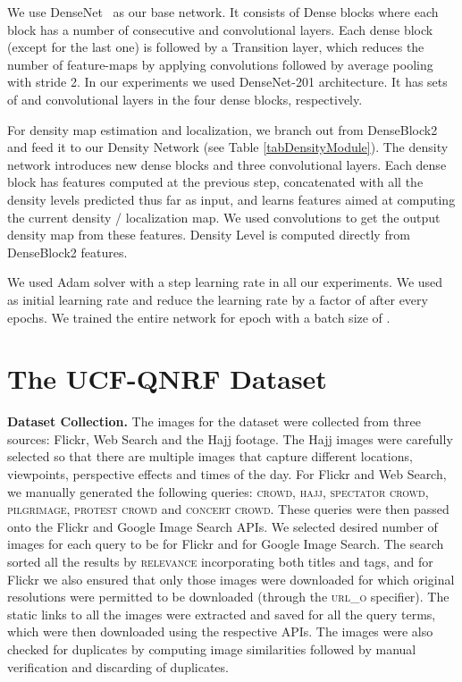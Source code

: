 \documentclass[runningheads]{llncs}
\begin{document}
We use DenseNet~\cite{huang2016densely} as our base network. It consists of  Dense blocks where each block has a number of consecutive  and  convolutional layers. Each dense block (except for the last one) is followed by a Transition layer, which reduces the number of feature-maps by applying  convolutions followed by  average pooling with stride 2. In our experiments we used DenseNet-201 architecture. It has  sets of  and  convolutional layers in the four dense blocks, respectively.

For density map estimation and localization, we branch out from DenseBlock2 and feed it to our Density Network (see Table \ref{tabDensityModule}). The density network introduces  new dense blocks and three   convolutional layers. Each dense block has features computed at the previous step, concatenated with all the density levels predicted thus far as input, and learns features aimed at computing the current density / localization map. We used  convolutions to get the output density map from these features. Density Level  is computed directly from DenseBlock2 features.

We used Adam solver with a step learning rate in all our experiments. We used  as initial learning rate and reduce the learning rate by a factor of  after every  epochs. We trained the entire network for  epoch with a batch size of .

\section{The UCF-QNRF Dataset}\label{secDataset}
\smallskip
\noindent\textbf{Dataset Collection.} The images for the dataset were collected from three sources: Flickr, Web Search and the Hajj footage. The Hajj images were carefully selected so that there are multiple images that capture different locations, viewpoints, perspective effects and times of the day. For Flickr and Web Search, we manually generated the following queries: \textsc{crowd}, \textsc{hajj}, \textsc{spectator crowd}, \textsc{pilgrimage}, \textsc{protest crowd} and \textsc{concert crowd}. These queries were then passed onto the Flickr and Google Image Search APIs. We selected desired number of images for each query to be  for Flickr and  for Google Image Search. The search sorted all the results by \textsc{relevance} incorporating both titles and tags, and for Flickr we also ensured that only those images were downloaded for which original resolutions were permitted to be downloaded (through the \textsc{url\_o} specifier). The static links to all the images were extracted and saved for all the query terms, which were then downloaded using the respective APIs. The images were also checked for duplicates by computing image similarities followed by manual verification and discarding of duplicates.
\vskip 0.1in
\end{document}
